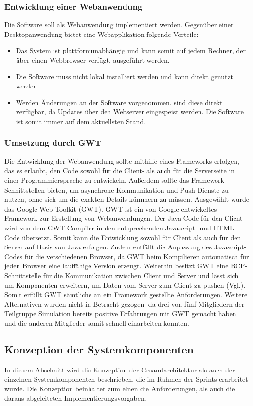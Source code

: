 \subsubsection{Entwicklung einer Webanwendung}\label{sec:Entwicklung einer Webanwendung} 
Die Software soll als Webanwendung implementiert werden. Gegenüber einer Desktopanwendung bietet eine Webapplikation folgende Vorteile:
\begin{itemize}
\item Das System ist plattformunabhängig und kann somit auf jedem Rechner, der über einen Webbrowser verfügt, ausgeführt werden.
\item Die Software muss nicht lokal installiert werden und kann direkt genutzt werden.
\item Werden Änderungen an der Software vorgenommen, sind diese direkt verfügbar, da Updates über den Webserver eingespeist werden. Die Software ist somit immer auf dem aktuellsten Stand. 
\end{itemize}
\subsubsection{Umsetzung durch GWT}\label{GWT} 
Die Entwicklung der Webanwendung sollte mithilfe eines Frameworks erfolgen, das es erlaubt, den Code sowohl für die Client- als auch für die Serverseite in einer Programmiersprache zu entwickeln. Außerdem sollte das Framework Schnittstellen bieten, um asynchrone Kommunikation und Push-Dienste zu nutzen, ohne sich um die exakten Details kümmern zu müssen. Ausgewählt wurde das Google Web Toolkit (GWT). GWT ist ein von Google entwickeltes Framework zur Erstellung von Webanwendungen. Der Java-Code für den Client wird von dem GWT Compiler in den entsprechenden Javascript- und HTML-Code übersetzt. Somit kann die Entwicklung sowohl für Client als auch für den Server auf Basis von Java erfolgen. Zudem entfällt die Anpassung des Javascript-Codes für die verschiedenen Browser, da GWT beim Kompilieren automatisch für jeden Browser eine lauffähige Version erzeugt. Weiterhin besitzt GWT  eine RCP-Schnittstelle für die Kommunikation zwischen Client und Server und lässt sich um Komponenten erweitern, um Daten vom Server zum Client zu pushen (Vgl.\cite{gwt}). Somit erfüllt GWT sämtliche an ein Framework gestellte Anforderungen. Weitere Alternativen wurden nicht in Betracht gezogen, da drei von fünf Mitgliedern der Teilgruppe Simulation bereits positive Erfahrungen mit GWT gemacht haben und die anderen Mitglieder somit schnell einarbeiten konnten. 
\subsection{Konzeption der Systemkomponenten}
In diesem Abschnitt wird die Konzeption der Gesamtarchitektur als auch der einzelnen Systemkomponenten beschrieben, die im Rahmen der Sprints erarbeitet wurde. Die Konzeption beinhaltet zum einen die Anforderungen, als auch die daraus abgeleiteten Implementierungsvorgaben.
\newpage
